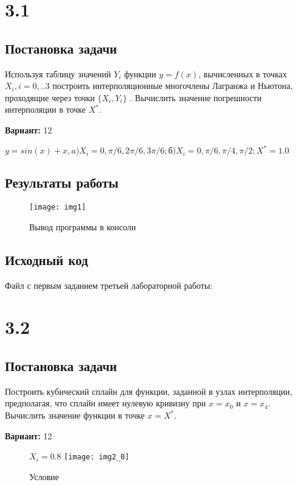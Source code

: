 \section* {3.1}

\subsection{Постановка задачи}
Используя таблицу значений $Y_i$  функции $y=f(x)$, вычисленных в точках   $X_i, i=0,..3$  построить интерполяционные многочлены Лагранжа и Ньютона, проходящие через точки $\{X_i,Y_i \}$ .  Вычислить значение погрешности интерполяции в точке $X^*$. 

{\bfseries Вариант:} 12

$y=sin(x)+x, a) X_i= 0, \pi/6, 2\pi/6, 3\pi/6;  б)X_i= 0, \pi/6, \pi/4, \pi/2; X^* = 1.0$

\subsection{Результаты работы}
\begin{figure}[h!]
\centering
\texttt{[image: img1]}
\caption{Вывод программы в консоли}
\end{figure}
\pagebreak


\subsection{Исходный код}
Файл с первым заданием третьей лабораторной работы:

\pagebreak

\section* {3.2}

\subsection{Постановка задачи}
Построить кубический сплайн для функции, заданной в узлах интерполяции, предполагая, что сплайн имеет нулевую кривизну при $x=x_0$  и $x=x_4$. Вычислить значение функции в точке $x=X^*$. 

{\bfseries Вариант:} 12
\begin{figure}[h!]
$X_i=0.8$
\centering
\texttt{[image: img2\_0]}
\caption{Условие}
\end{figure}


